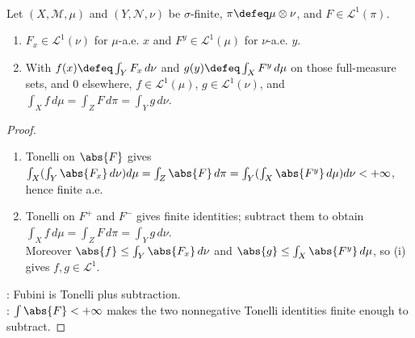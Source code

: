 \begin{theorem} \label{thm:fubini-sigma-finite-product-measures} \\
Let $(X,\mathcal{M},\mu)$ and $(Y,\mathcal{N},\nu)$ be $\sigma$-finite, $\pi\defeq\mu\otimes\nu$, and $F\in\mathscr{L}^1(\pi)$.
\begin{enumerate}[label=(\roman*)]
\setlength{\itemsep}{0pt}
\item $F_x\in\mathscr{L}^1(\nu)$ for $\mu$-a.e. $x$ and $F^y\in\mathscr{L}^1(\mu)$ for $\nu$-a.e. $y$.
\item With $f(x)\defeq\int_YF_x\,d\nu$ and $g(y)\defeq\int_XF^y\,d\mu$ on those full-measure sets, and $0$ elsewhere, $f\in\mathscr{L}^1(\mu)$, $g\in\mathscr{L}^1(\nu)$, and $\int_Xf\,d\mu=\int_ZF\,d\pi=\int_Yg\,d\nu$.
\end{enumerate}
\begin{proof}
\begin{enumerate}[label=(\roman*)]
\setlength{\itemsep}{0pt}
\item Tonelli on $\abs{F}$ gives $\int_X(\int_Y\abs{F_x}\,d\nu)d\mu=\int_Z\abs{F}\,d\pi=\int_Y(\int_X\abs{F^y}\,d\mu)d\nu<+\infty$, hence finite a.e.
\item Tonelli on $F^+$ and $F^-$ gives finite identities; subtract them to obtain $\int_Xf\,d\mu=\int_ZF\,d\pi=\int_Yg\,d\nu$.\\
Moreover $\abs{f}\leq\int_Y\abs{F_x}\,d\nu$ and $\abs{g}\leq\int_X\abs{F^y}\,d\mu$, so (i) gives $f,g\in\mathscr{L}^1$.
\end{enumerate}
: Fubini is Tonelli plus subtraction.\\
: $\int\abs{F}<+\infty$ makes the two nonnegative Tonelli identities finite enough to subtract.
\end{proof}
\end{theorem}

